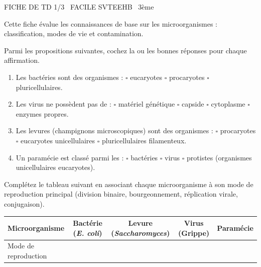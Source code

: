 \documentclass[11pt]{article}
\begin{document}
\begin{tcolorbox}[enhanced,colback=popink,colframe=popink,arc=10pt,boxrule=0pt,left=12pt,right=12pt,top=9pt,bottom=9pt]
{\color{white}\popxbold\small FICHE DE TD 1/3 \textbullet\ FACILE \hfill SVTEEHB \textbullet\ 3ème\par}
\end{tcolorbox}
\vspace{4pt}
Cette fiche évalue les connaissances de base sur les microorganismes : classification, modes de vie et contamination.

\begin{exercice}
Parmi les propositions suivantes, cochez la ou les bonnes réponses pour chaque affirmation.
\begin{enumerate}
    \item Les bactéries sont des organismes : \quad $\square$ eucaryotes \quad $\square$ procaryotes \quad $\square$ pluricellulaires.
    \item Les virus ne possèdent pas de : \quad $\square$ matériel génétique \quad $\square$ capside \quad $\square$ cytoplasme \quad $\square$ enzymes propres.
    \item Les levures (champignons microscopiques) sont des organismes : \quad $\square$ procaryotes \quad $\square$ eucaryotes unicellulaires \quad $\square$ pluricellulaires filamenteux.
    \item Un paramécie est classé parmi les : \quad $\square$ bactéries \quad $\square$ virus \quad $\square$ protistes (organismes unicellulaires eucaryotes).
\end{enumerate}
\end{exercice}

\begin{exercice}
Complétez le tableau suivant en associant chaque microorganisme à son mode de reproduction principal (division binaire, bourgeonnement, réplication virale, conjugaison).
\begin{center}
\begin{tabular}{|l|c|c|c|c|}
\hline
Microorganisme & Bactérie (\textit{E. coli}) & Levure (\textit{Saccharomyces}) & Virus (Grippe) & Paramécie \\
\hline
Mode de reproduction & & & & \\
\hline
\end{tabular}
\end{center}
\end{exercice}
\end{document}

